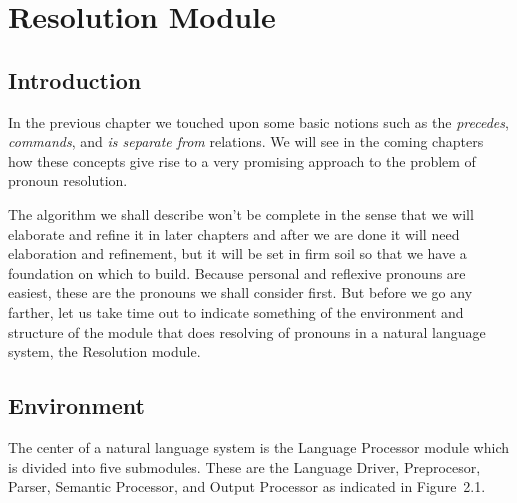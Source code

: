 \documentclass{article}
\begin{document}
\section{Resolution Module}


\subsection{Introduction}

In the previous chapter we touched upon some basic notions such
as the \textit{precedes}, \textit{commands}, and
\textit{is separate from} relations. We will see in the coming
chapters how these concepts give rise to a very promising
approach to the problem of pronoun resolution.

The algorithm we shall describe won't be complete in the sense
that we will elaborate and refine it in later chapters and after
we are done it will need elaboration and refinement, but it will
be set in firm soil so that we have a foundation on which to
build. Because personal and reflexive pronouns are easiest,
these are the pronouns we shall consider first. But before we go
any farther, let us take time out to indicate something of the
environment and structure of the module that does resolving of
pronouns in a natural language system, the Resolution module.


\subsection{Environment}

The center of a natural language system is the Language
Processor module which is divided into five submodules.  These
are the Language Driver, Preprocesor, Parser, Semantic
Processor, and Output Processor as indicated in Figure~2.1.
\end{document}
